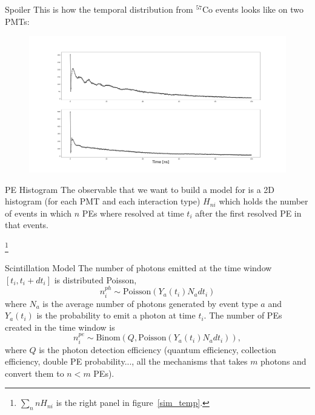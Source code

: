 \documentclass{beamer}
\newcommand\blfootnote[1]{%
  \begingroup
  \renewcommand\thefootnote{}\footnote{#1}%
  \addtocounter{footnote}{-1}%
  \endgroup
}
\begin{document}
\begin{frame}{Spoiler}
This is how the temporal distribution from $^{57}$Co events looks like on two PMTs:
\begin{figure}[h]
\includegraphics[width=1\textwidth]{temporal1.png}
\end{figure}
\end{frame}

\begin{frame}{PE Histogram}
The observable that we want to build a model for is a 2D histogram (for each PMT and each interaction type) $H_{ni}$ which holds the number of events in which $n$ PEs where resolved at time $t_i$ after the first resolved PE in that events.

\blfootnote{$\sum_nnH_{ni}$ is the right panel in figure~\ref{sim_temp}.}

\end{frame}

\begin{frame}{Scintillation Model}
The number of photons emitted at the time window $[t_i, t_i+dt_i]$ is distributed Poisson,
\begin{equation}
n_i^{ph}\sim\text{Poisson}(Y_a(t_i)N_adt_i)
\end{equation} 
where $N_a$ is the average number of photons generated by event type $a$ and $Y_a(t_i)$ is the probability to emit a photon at time $t_i$.
The number of PEs created in the time window is
\begin{equation}
n_i^{pe}\sim\text{Binom}(Q,\text{Poisson}(Y_a(t_i)N_adt_i)),
\end{equation}
where $Q$ is the photon detection efficiency (quantum efficiency, collection efficiency, double PE probability..., all the mechanisms that takes $m$ photons and convert them to $n<m$ PEs).
\end{frame}
\end{document}
